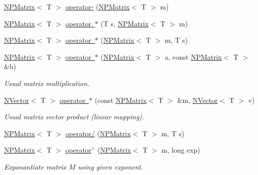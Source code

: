 \begin{DoxyCompactItemize}
\item 
\mbox{\hyperlink{class_n_p_matrix}{N\+P\+Matrix}}$<$ T $>$ \mbox{\hyperlink{class_n_p_matrix_aa302ce263faf60e46f6d6e0c7d65304c}{operator-\/}} (\mbox{\hyperlink{class_n_p_matrix}{N\+P\+Matrix}}$<$ T $>$ m)
\item 
\mbox{\hyperlink{class_n_p_matrix}{N\+P\+Matrix}}$<$ T $>$ \mbox{\hyperlink{class_n_p_matrix_a341946699bd94168d0c64dc2b61ec179}{operator $\ast$}} (T s, \mbox{\hyperlink{class_n_p_matrix}{N\+P\+Matrix}}$<$ T $>$ m)
\item 
\mbox{\hyperlink{class_n_p_matrix}{N\+P\+Matrix}}$<$ T $>$ \mbox{\hyperlink{class_n_p_matrix_a89a139dbf286cff061bc6b6c92b57f0b}{operator $\ast$}} (\mbox{\hyperlink{class_n_p_matrix}{N\+P\+Matrix}}$<$ T $>$ m, T s)
\item 
\mbox{\hyperlink{class_n_p_matrix}{N\+P\+Matrix}}$<$ T $>$ \mbox{\hyperlink{class_n_p_matrix_ac6fa24ae5fd1897e69914f3ae398d29f}{operator $\ast$}} (\mbox{\hyperlink{class_n_p_matrix}{N\+P\+Matrix}}$<$ T $>$ a, const \mbox{\hyperlink{class_n_p_matrix}{N\+P\+Matrix}}$<$ T $>$ \&b)
\begin{DoxyCompactList}\small\item\em Usual matrix multiplication. \end{DoxyCompactList}\item 
\mbox{\hyperlink{class_n_vector}{N\+Vector}}$<$ T $>$ \mbox{\hyperlink{class_n_p_matrix_a27b5aa229eb163bfb79d7925abffafb7}{operator $\ast$}} (const \mbox{\hyperlink{class_n_p_matrix}{N\+P\+Matrix}}$<$ T $>$ \&m, \mbox{\hyperlink{class_n_vector}{N\+Vector}}$<$ T $>$ v)
\begin{DoxyCompactList}\small\item\em Usual matrix vector product (linear mapping). \end{DoxyCompactList}\item 
\mbox{\hyperlink{class_n_p_matrix}{N\+P\+Matrix}}$<$ T $>$ \mbox{\hyperlink{class_n_p_matrix_ae976e53eca81caea13a8e077ced70d68}{operator/}} (\mbox{\hyperlink{class_n_p_matrix}{N\+P\+Matrix}}$<$ T $>$ m, T s)
\item 
\mbox{\hyperlink{class_n_p_matrix}{N\+P\+Matrix}}$<$ T $>$ \mbox{\hyperlink{class_n_p_matrix_aaad3ba825a660b8019218ed6088c2cb7}{operator$^\wedge$}} (\mbox{\hyperlink{class_n_p_matrix}{N\+P\+Matrix}}$<$ T $>$ m, long exp)
\begin{DoxyCompactList}\small\item\em Exponantiate matrix $ M $ using given exponent. \end{DoxyCompactList}\item 

\end{DoxyCompactItemize}
